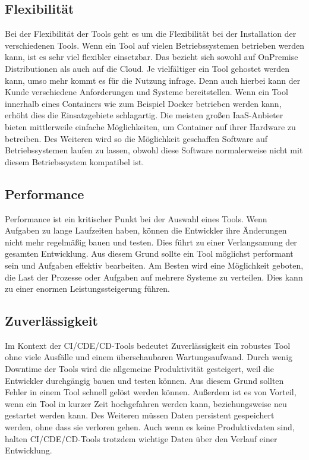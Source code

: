 \subsection{Flexibilität}
Bei der Flexibilität der Tools geht es um die Flexibilität bei der Installation der verschiedenen Tools. Wenn ein Tool auf vielen Betriebssystemen betrieben werden kann, ist es sehr viel flexibler einsetzbar. Das bezieht sich sowohl auf OnPremise Distributionen als auch auf die Cloud. Je vielfältiger ein Tool gehostet werden kann, umso mehr kommt es für die Nutzung infrage. Denn auch hierbei kann der Kunde verschiedene Anforderungen und Systeme bereitstellen. Wenn ein Tool innerhalb eines Containers wie zum Beispiel Docker betrieben werden kann, erhöht dies die Einsatzgebiete schlagartig. Die meisten großen \ac{IaaS}-Anbieter bieten mittlerweile einfache Möglichkeiten, um Container auf ihrer Hardware zu betreiben. Des Weiteren wird so die Möglichkeit geschaffen Software auf Betriebssystemen laufen zu lassen, obwohl diese Software normalerweise nicht mit diesem Betriebssystem kompatibel ist.
\subsection{Performance}
Performance ist ein kritischer Punkt bei der Auswahl eines Tools. Wenn Aufgaben zu lange Laufzeiten haben, können die Entwickler ihre Änderungen nicht mehr regelmäßig bauen und testen. Dies führt zu einer Verlangsamung der gesamten Entwicklung. Aus diesem Grund sollte ein Tool möglichst performant sein und Aufgaben effektiv bearbeiten. Am Besten wird eine Möglichkeit geboten, die Last der Prozesse oder Aufgaben auf mehrere Systeme zu verteilen. Dies kann zu einer enormen Leistungssteigerung führen. 
\subsection{Zuverlässigkeit}
Im Kontext der \ac{CI}/\ac{CDE}/\ac{CD}-Tools bedeutet Zuverlässigkeit ein robustes Tool ohne viele Ausfälle und einem überschaubaren Wartungsaufwand. Durch wenig Downtime der Tools wird die allgemeine Produktivität gesteigert, weil die Entwickler durchgängig bauen und testen können. Aus diesem Grund sollten Fehler in einem Tool schnell gelöst werden können. Außerdem ist es von Vorteil, wenn ein Tool in kurzer Zeit hochgefahren werden kann, beziehungsweise neu gestartet werden kann. Des Weiteren müssen Daten persistent gespeichert werden, ohne dass sie verloren gehen. Auch wenn es keine Produktivdaten sind, halten \ac{CI}/\ac{CDE}/\ac{CD}-Tools trotzdem wichtige Daten über den Verlauf einer Entwicklung.
